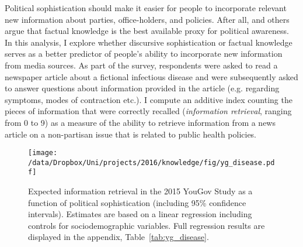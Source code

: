 
Political sophistication should make it easier for people to incorporate relevant new information about parties, office-holders, and policies. After all,  \citet{zaller1990political,zaller1992nature} and others argue that factual knowledge is the best available proxy for political awareness. In this analysis, I explore whether discursive sophistication or factual knowledge serves as a better predictor of people's ability to incorporate new information from media sources. As part of the survey, respondents were asked to read a newspaper article about a fictional infectious disease and were subsequently asked to answer questions about information provided in the article (e.g. regarding symptoms, modes of contraction etc.). I compute an additive index counting the pieces of information that were correctly recalled (\textit{information retrieval}, ranging from 0 to 9) as a measure of the ability to retrieve information from a news article on a non-partisan issue that is related to public health policies. 

\begin{figure}[h]\centering
\texttt{[image: /data/Dropbox/Uni/projects/2016/knowledge/fig/yg\_disease.pdf]}
\caption[Expected information retrieval in the 2015 YouGov Study as a function of political sophistication]{Expected information retrieval in the 2015 YouGov Study as a function of political sophistication (including 95\% confidence intervals). Estimates are based on a linear regression including controls for sociodemographic variables. Full regression results are displayed in the appendix, Table~\ref{tab:yg_disease}.}\label{fig:yg_disease}
\end{figure}

